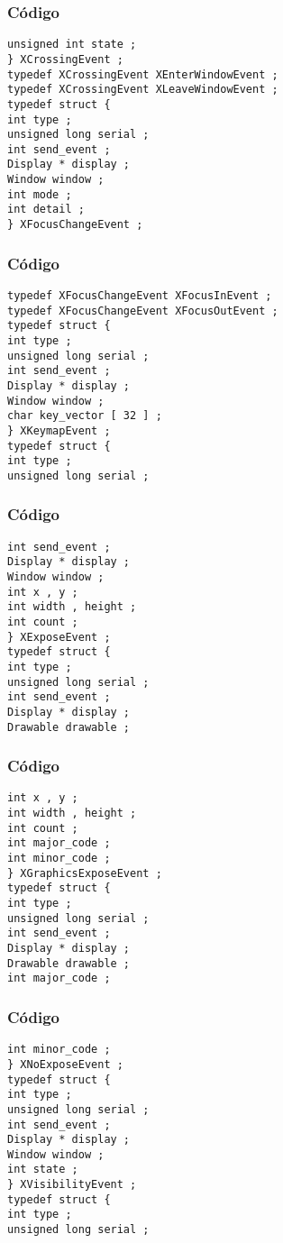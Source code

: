 \documentclass{beamer}
\begin{document}
\begin{frame}[fragile]
\frametitle{C\'odigo}
\begin{verbatim}
unsigned int state ; 
} XCrossingEvent ; 
typedef XCrossingEvent XEnterWindowEvent ; 
typedef XCrossingEvent XLeaveWindowEvent ; 
typedef struct { 
int type ; 
unsigned long serial ; 
int send_event ; 
Display * display ; 
Window window ; 
int mode ; 
int detail ; 
} XFocusChangeEvent ; 
\end{verbatim}
\end{frame}
\begin{frame}[fragile]
\frametitle{C\'odigo}
\begin{verbatim}
typedef XFocusChangeEvent XFocusInEvent ; 
typedef XFocusChangeEvent XFocusOutEvent ; 
typedef struct { 
int type ; 
unsigned long serial ; 
int send_event ; 
Display * display ; 
Window window ; 
char key_vector [ 32 ] ; 
} XKeymapEvent ; 
typedef struct { 
int type ; 
unsigned long serial ; 
\end{verbatim}
\end{frame}
\begin{frame}[fragile]
\frametitle{C\'odigo}
\begin{verbatim}
int send_event ; 
Display * display ; 
Window window ; 
int x , y ; 
int width , height ; 
int count ; 
} XExposeEvent ; 
typedef struct { 
int type ; 
unsigned long serial ; 
int send_event ; 
Display * display ; 
Drawable drawable ; 
\end{verbatim}
\end{frame}
\begin{frame}[fragile]
\frametitle{C\'odigo}
\begin{verbatim}
int x , y ; 
int width , height ; 
int count ; 
int major_code ; 
int minor_code ; 
} XGraphicsExposeEvent ; 
typedef struct { 
int type ; 
unsigned long serial ; 
int send_event ; 
Display * display ; 
Drawable drawable ; 
int major_code ; 
\end{verbatim}
\end{frame}
\begin{frame}[fragile]
\frametitle{C\'odigo}
\begin{verbatim}
int minor_code ; 
} XNoExposeEvent ; 
typedef struct { 
int type ; 
unsigned long serial ; 
int send_event ; 
Display * display ; 
Window window ; 
int state ; 
} XVisibilityEvent ; 
typedef struct { 
int type ; 
unsigned long serial ; 
\end{verbatim}
\end{frame}
\end{document}

